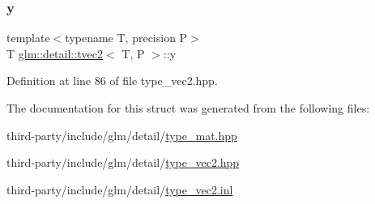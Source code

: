 \mbox{\label{structglm_1_1detail_1_1tvec2_ab30528ab747cef8d129cf793aeec521a}} 
\subsubsection{\texorpdfstring{y}{y}}
{\footnotesize\ttfamily template$<$typename T, precision P$>$ \\
T \hyperlink{structglm_1_1detail_1_1tvec2}{glm\+::detail\+::tvec2}$<$ T, P $>$\+::y}



Definition at line 86 of file type\+\_\+vec2.\+hpp.



The documentation for this struct was generated from the following files\+:\begin{DoxyCompactItemize}
\item 
third-\/party/include/glm/detail/\hyperlink{type__mat_8hpp}{type\+\_\+mat.\+hpp}\item 
third-\/party/include/glm/detail/\hyperlink{type__vec2_8hpp}{type\+\_\+vec2.\+hpp}\item 
third-\/party/include/glm/detail/\hyperlink{type__vec2_8inl}{type\+\_\+vec2.\+inl}\end{DoxyCompactItemize}
